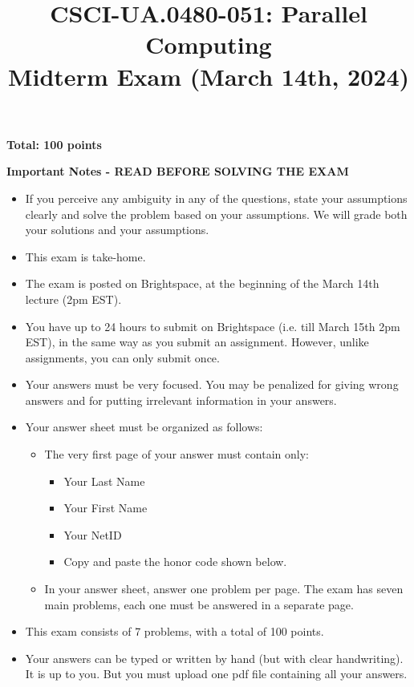 \documentclass{article}
\begin{document}
\title{CSCI-UA.0480-051: Parallel Computing \\ Midterm Exam (March 14th, 2024)}
\author{}
\date{}
\maketitle

\textbf{Total: 100 points}

\textbf{Important Notes - READ BEFORE SOLVING THE EXAM}

\begin{itemize}
    \item If you perceive any ambiguity in any of the questions, state your assumptions clearly and solve the problem based on your assumptions. We will grade both your solutions and your assumptions.
    \item This exam is take-home.
    \item The exam is posted on Brightspace, at the beginning of the March 14th lecture (2pm EST).
    \item You have up to 24 hours to submit on Brightspace (i.e. till March 15th 2pm EST), in the same way as you submit an assignment. However, unlike assignments, you can only submit once.
    \item Your answers must be very focused. You may be penalized for giving wrong answers and for putting irrelevant information in your answers.
    \item Your answer sheet must be organized as follows:
    \begin{itemize}
        \item The very first page of your answer must contain only:
        \begin{itemize}
            \item Your Last Name
            \item Your First Name
            \item Your NetID
            \item Copy and paste the honor code shown below.
        \end{itemize}
        \item In your answer sheet, answer one problem per page. The exam has seven main problems, each one must be answered in a separate page.
    \end{itemize}
    \item This exam consists of 7 problems, with a total of 100 points.
    \item Your answers can be typed or written by hand (but with clear handwriting). It is up to you. But you must upload one pdf file containing all your answers.
\end{itemize}
\end{document}
